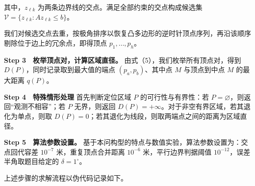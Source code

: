 其中，\(z_{\ell k}\) 为两条边界线的交点。满足全部约束的交点构成候选集 \(\mathcal V=\{z_{\ell k}:Az_{\ell k}\le b\}\)。

我们对候选交点去重，按极角排序以恢复凸多边形的逆时针顶点序列，再沿该顺序剔除位于边上的冗余点，即得顶点 \(p_1,\ldots,p_h\)。

\textbf{Step 3　枚举顶点对，计算区域直径。} 由式（5），我们枚举所有顶点对，得到 \(D(P)\)，同时记录取到最大值的端点 \((p_a,p_b)\)、其中点 \(M\) 与顶点到中点 \(M\) 的最大距离 \(q(P)\)。

\textbf{Step 4　特殊情形处理} 首先判断定位区域 \(P\) 的可行性与有界性：若 \(P=\varnothing\)，则返回``观测不相容''；若 \(P\) 无界，则返回 \(D(P)=+\infty\)。对于非空有界区域，若其退化为单点，则取 \(D(P)=0\)；若其退化为线段，则取两端点之间的距离为区域直径。

\textbf{Step 5　算法参数设置。} 基于本问构型的特点与数值实验，算法参数设置为：交点回代容差 \(10^{-7}\) 米，重复顶点合并距离 \(10^{-6}\) 米，平行边界判据阈值 \(10^{-12}\)，误差半角取题目给定的 \(\delta=1^\circ\)。

上述步骤的求解流程以伪代码记录如下。

